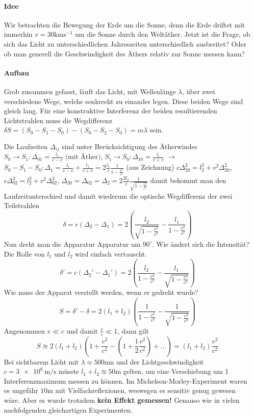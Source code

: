 \documentclass[oneside]{book}
\theoremstyle{definition}
\newcommand{\conseq}{$\rightarrow$~}
\begin{document}
\paragraph{Idee} Wir betrachten die Bewegung der Erde um die Sonne, denn die Erde driftet mit immerhin $v = 30 \mathrm{km}\mathrm{s}^{-1}$ um die Sonne durch den Weltäther. Jetzt ist die Frage, ob sich das Licht zu unterschiedlichen Jahreszeiten unterschiedlich ausbreitet? Oder ob man generell die Geschwindigkeit des Äthers relativ zur Sonne messen kann?

\paragraph{Aufbau}
Grob zusammen gefasst, läuft das Licht, mit Wellenlänge $\lambda$, über zwei verschiedene Wege, welche senkrecht zu einander legen. Diese beiden Wege sind gleich lang. Für eine konstruktive Interferenz der beiden resultierenden Lichtstrahlen muss die Wegdifferenz $\delta S = (S_0 - S_1 - S_0) - (S_0 - S_2 - S_0) = m \lambda$ sein.

Die Laufzeiten $\Delta_{ij}$ sind unter Berücksichtigung des Ätherwindes $S_0 \to S_1: \Delta_{01} = \frac{l_1}{c - v} \text{~(mit Äther)}$, $S_1 \to S_0: \Delta_{10} = \frac{l_1}{c + v}$ \conseq $S_0 - S_1 - S_0: \Delta_1 = \frac{l_1}{c-v} + \frac{l_1}{c+v} = 2 \frac{l_1}{c} \frac{1}{1 - \frac{v^2}{c^2}}$ (aus Zeichnung) $c\Delta_{20}^2 = l_2^2 + v^2 \Delta_{20}^2$, $c\Delta_{02}^2 = l_2^2 + v^2 \Delta_{02}^2$, $\Delta_{20} = \Delta_{02} = \Delta_{2} = 2 \frac{2l_2}{c} \frac{1}{\sqrt{1 - \frac{v^2}{c^2}}}$ damit bekommt man den Laufzeitunterschied und damit wiederum die optische Wegdifferenz der zwei Teilstrahlen
$$\delta = c (\Delta_2 - \Delta_1) = 2 \left(\frac{l_2}{\sqrt{1 - \frac{v^2}{c^2}}} - \frac{l_1}{1 - \frac{v^2}{c^2}}\right)$$ 
Nun dreht man die Apparatur Apparatur um $90^\circ$. Wie ändert sich die Intensität? Die Rolle von $l_1$ und $l_2$ wird einfach vertauscht.
$$\delta' = c (\Delta_2' - \Delta_1') = 2 \left(\frac{l_2}{1 - \frac{v^2}{c^2}} - \frac{l_1}{\sqrt{1 - \frac{v^2}{c^2}}}\right)$$
Wie muss der Apparat verstellt werden, wenn er gedreht wurde?
$$S = \delta' - \delta = 2(l_1 + l_2) \left(\frac{1}{1-\frac{v^2}{c^2}} - \frac{1}{\sqrt{1 - \frac{v^2}{c^2}}}\right)$$
Angenommen  $v \ll c$ und damit $\frac{v}{c} \ll 1$, dann gilt
$$S \approxeq 2 (l_1 + l_2) \left(1 + \frac{v^2}{c^2} - (1 + \frac{1}{2} \frac{v^2}{c^2}) + \dots\right) = (l_1 + l_2) \frac{v^2}{c^2}$$
Bei sichtbarem Licht mit $\lambda \approx 500 \mathrm{nm}$ und der Lichtgeschwindigkeit $c = \SI{3e8}{\meter\per\second}$ müsste $l_1 + l_2 \approxeq 50 \mathrm{m}$ gelten, um eine Verschiebung um 1 Interferenzmaximum messen zu können.
Im Michelson-Morley-Experiment waren es ungefähr $10 \mathrm{m}$ mit Vielfachreflexionen, weswegen es sensitiv genug gewesen wäre. Aber es wurde trotzdem \textbf{kein Effekt gemessen!} Genauso wie in vielen nachfolgenden gleichartigen Experimenten.
\end{document}
